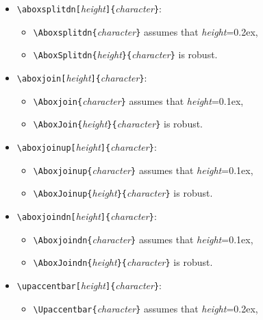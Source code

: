 \begin{itemize}
\begin{itemize}
        \verb?\AboxSplitup{?{\em height}\verb?}{?{\em character}\verb?}?
        is robust.
        \end{itemize}
\item \verb?\aboxsplitdn[?{\em height}\verb?]{?{\em character}\verb?}?:
        \begin{itemize}
        \item
        \verb?\Aboxsplitdn{?{\em character}\verb?}?
        assumes that {\em height}=\textsf{0.2ex},
        \item
        \verb?\AboxSplitdn{?{\em height}\verb?}{?{\em character}\verb?}?
        is robust.
        \end{itemize}
\item \verb?\aboxjoin[?{\em height}\verb?]{?{\em character}\verb?}?:
        \begin{itemize}
        \item
        \verb?\Aboxjoin{?{\em character}\verb?}?
        assumes that {\em height}=\textsf{0.1ex},
        \item
        \verb?\AboxJoin{?{\em height}\verb?}{?{\em character}\verb?}?
        is robust.
        \end{itemize}
\item \verb?\aboxjoinup[?{\em height}\verb?]{?{\em character}\verb?}?:
        \begin{itemize}
        \item
        \verb?\Aboxjoinup{?{\em character}\verb?}?
        assumes that {\em height}=\textsf{0.1ex},
        \item
        \verb?\AboxJoinup{?{\em height}\verb?}{?{\em character}\verb?}?
        is robust.
        \end{itemize}
\item \verb?\aboxjoindn[?{\em height}\verb?]{?{\em character}\verb?}?:
        \begin{itemize}
        \item
        \verb?\Aboxjoindn{?{\em character}\verb?}?
        assumes that {\em height}=\textsf{0.1ex},
        \item
        \verb?\AboxJoindn{?{\em height}\verb?}{?{\em character}\verb?}?
        is robust.
        \end{itemize}
\item \verb?\upaccentbar[?{\em height}\verb?]{?{\em character}\verb?}?:
        \begin{itemize}
        \item
        \verb?\Upaccentbar{?{\em character}\verb?}?
        assumes that {\em height}=\textsf{0.2ex},

\end{itemize}
\end{itemize}
